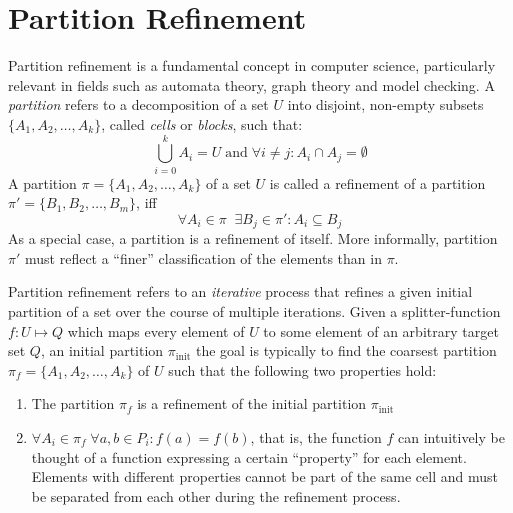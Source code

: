 		\clearpage
	
	\section{Partition Refinement}
		Partition refinement is a fundamental concept in computer science, particularly relevant in fields such as automata theory, graph theory and model checking.
		A \textit{partition} refers to a decomposition of a set $U$ into disjoint, non-empty subsets $\{ A_1, A_2, \ldots, A_k \}$, called \textit{cells} or \textit{blocks}, such that:
		\begin{equation*}
			\bigcup^k_{i=0} A_i = U \; \mathrm{and} \; \forall i \neq j: A_i \cap A_j = \emptyset
		\end{equation*}
		A partition $\pi = \{ A_1, A_2, \ldots, A_k \}$ of a set $U$ is called a refinement of a partition $\pi' = \{ B_1, B_2, \ldots, B_m \}$, iff
		\begin{equation*}
			\forall A_i \in \pi \;\; \exists B_j \in \pi' : A_i \subseteq B_j
		\end{equation*} 
		As a special case, a partition is a refinement of itself.
		More informally, partition $\pi'$ must reflect a \enquote{finer} classification of the elements than in $\pi$. 
		
		Partition refinement refers to an \textit{iterative} process that refines a given initial partition of a set over the course of multiple iterations.
		Given a splitter-function $f: U \mapsto Q$ which maps every element of $U$ to some element of an arbitrary target set $Q$, an initial partition $\pi_{\mathrm{init}}$ the goal is typically to find the coarsest partition $\pi_f = \{ A_1, A_2, \ldots, A_k \}$ of $U$ such that the following two properties hold:
		
		\begin{enumerate}
			\item The partition $\pi_f$ is a refinement of the initial partition $\pi_{\mathrm{init}}$
			\item $\forall A_i \in \pi_f \; \forall a, b \in P_i: f(a) = f(b)$, that is, the function $f$ can intuitively be thought of a function expressing a certain \enquote{property} for each element. Elements with different properties cannot be part of the same cell and must be separated from each other during the refinement process.
		\end{enumerate}
		
